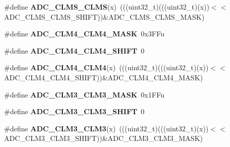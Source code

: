 \begin{DoxyCompactItemize}
\item 
\#define {\bfseries A\+D\+C\+\_\+\+C\+L\+M\+S\+\_\+\+C\+L\+MS}(x)~(((uint32\+\_\+t)(((uint32\+\_\+t)(x))$<$$<$A\+D\+C\+\_\+\+C\+L\+M\+S\+\_\+\+C\+L\+M\+S\+\_\+\+S\+H\+I\+FT))\&A\+D\+C\+\_\+\+C\+L\+M\+S\+\_\+\+C\+L\+M\+S\+\_\+\+M\+A\+SK)\hypertarget{group__ADC__Register__Masks_ga83a90dcd2d54b25cc64ad18d6b9d4f07}{}\label{group__ADC__Register__Masks_ga83a90dcd2d54b25cc64ad18d6b9d4f07}

\item 
\#define {\bfseries A\+D\+C\+\_\+\+C\+L\+M4\+\_\+\+C\+L\+M4\+\_\+\+M\+A\+SK}~0x3\+F\+Fu\hypertarget{group__ADC__Register__Masks_ga9f8f5b63268c5b87f04ee884579a385b}{}\label{group__ADC__Register__Masks_ga9f8f5b63268c5b87f04ee884579a385b}

\item 
\#define {\bfseries A\+D\+C\+\_\+\+C\+L\+M4\+\_\+\+C\+L\+M4\+\_\+\+S\+H\+I\+FT}~0\hypertarget{group__ADC__Register__Masks_gafa9121fc54ce9386fdc4c1d05f45d0de}{}\label{group__ADC__Register__Masks_gafa9121fc54ce9386fdc4c1d05f45d0de}

\item 
\#define {\bfseries A\+D\+C\+\_\+\+C\+L\+M4\+\_\+\+C\+L\+M4}(x)~(((uint32\+\_\+t)(((uint32\+\_\+t)(x))$<$$<$A\+D\+C\+\_\+\+C\+L\+M4\+\_\+\+C\+L\+M4\+\_\+\+S\+H\+I\+FT))\&A\+D\+C\+\_\+\+C\+L\+M4\+\_\+\+C\+L\+M4\+\_\+\+M\+A\+SK)\hypertarget{group__ADC__Register__Masks_gad44edd7b22b26259838f02e5348e2449}{}\label{group__ADC__Register__Masks_gad44edd7b22b26259838f02e5348e2449}

\item 
\#define {\bfseries A\+D\+C\+\_\+\+C\+L\+M3\+\_\+\+C\+L\+M3\+\_\+\+M\+A\+SK}~0x1\+F\+Fu\hypertarget{group__ADC__Register__Masks_ga546b5a27d980deed324add231c050a6f}{}\label{group__ADC__Register__Masks_ga546b5a27d980deed324add231c050a6f}

\item 
\#define {\bfseries A\+D\+C\+\_\+\+C\+L\+M3\+\_\+\+C\+L\+M3\+\_\+\+S\+H\+I\+FT}~0\hypertarget{group__ADC__Register__Masks_ga9bdd0a97bea9576ea5c9eccd54c08940}{}\label{group__ADC__Register__Masks_ga9bdd0a97bea9576ea5c9eccd54c08940}

\item 
\#define {\bfseries A\+D\+C\+\_\+\+C\+L\+M3\+\_\+\+C\+L\+M3}(x)~(((uint32\+\_\+t)(((uint32\+\_\+t)(x))$<$$<$A\+D\+C\+\_\+\+C\+L\+M3\+\_\+\+C\+L\+M3\+\_\+\+S\+H\+I\+FT))\&A\+D\+C\+\_\+\+C\+L\+M3\+\_\+\+C\+L\+M3\+\_\+\+M\+A\+SK)\hypertarget{group__ADC__Register__Masks_gaccf9cd66317e1c61f7daacabd0d95904}{}\label{group__ADC__Register__Masks_gaccf9cd66317e1c61f7daacabd0d95904}


\end{DoxyCompactItemize}
